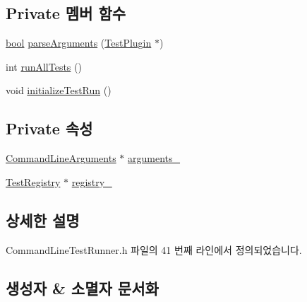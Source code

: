 \subsection*{Private 멤버 함수}
\begin{DoxyCompactItemize}
\item 
\hyperlink{avb__gptp_8h_af6a258d8f3ee5206d682d799316314b1}{bool} \hyperlink{class_command_line_test_runner_a157b10244193d835756413ccc51a1a4e}{parse\+Arguments} (\hyperlink{class_test_plugin}{Test\+Plugin} $\ast$)
\item 
int \hyperlink{class_command_line_test_runner_a4d48613a805eeffb0369f61bb0328b37}{run\+All\+Tests} ()
\item 
void \hyperlink{class_command_line_test_runner_a5be751c5edcb3da7c175b6b1298ef433}{initialize\+Test\+Run} ()
\end{DoxyCompactItemize}
\subsection*{Private 속성}
\begin{DoxyCompactItemize}
\item 
\hyperlink{class_command_line_arguments}{Command\+Line\+Arguments} $\ast$ \hyperlink{class_command_line_test_runner_ad70db7454c20154ae8a986a0f28d14d1}{arguments\+\_\+}
\item 
\hyperlink{class_test_registry}{Test\+Registry} $\ast$ \hyperlink{class_command_line_test_runner_a06daa3d9c1f367883447738388bd760d}{registry\+\_\+}
\end{DoxyCompactItemize}


\subsection{상세한 설명}


Command\+Line\+Test\+Runner.\+h 파일의 41 번째 라인에서 정의되었습니다.



\subsection{생성자 \& 소멸자 문서화}
